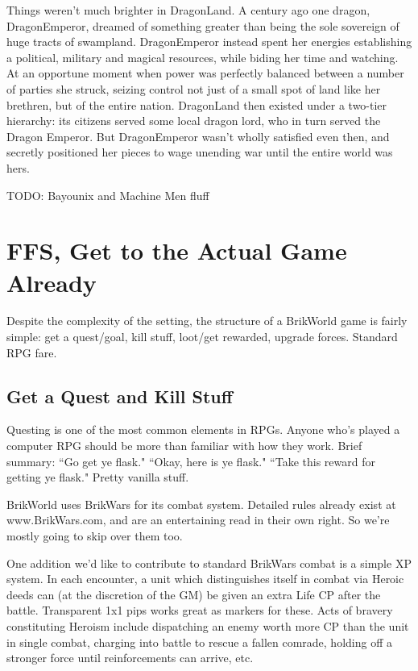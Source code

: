 \documentclass[12pt,a4paper,twocolumn]{article}
\begin{document}
Things weren't much brighter in DragonLand.  A century ago one dragon, DragonEmperor, dreamed of something greater than being the sole sovereign of huge tracts of swampland. DragonEmperor instead spent her energies establishing a political, military and magical resources, while biding her time and watching.  At an opportune moment when power was perfectly balanced between a number of parties she struck, seizing control not just of a small spot of land like her brethren, but of the entire nation.  DragonLand then existed under a two-tier hierarchy: its citizens served some local dragon lord, who in turn served the Dragon Emperor.  But DragonEmperor wasn't wholly satisfied even then, and secretly positioned her pieces to wage unending war until the entire world was hers.

TODO: Bayounix and Machine Men fluff

\section{FFS, Get to the Actual Game Already}

Despite the complexity of the setting, the structure of a BrikWorld game is fairly simple: get a quest/goal, kill stuff, loot/get rewarded, upgrade forces.  Standard RPG fare.

\subsection{Get a Quest and Kill Stuff}

Questing is one of the most common elements in RPGs. Anyone who's played a computer RPG should be more than familiar with how they work.  Brief summary: ``Go get ye flask." ``Okay, here is ye flask." ``Take this reward for getting ye flask."  Pretty vanilla stuff.  

BrikWorld uses BrikWars for its combat system.  Detailed rules already exist at www.BrikWars.com, and are an entertaining read in their own right.  So we're mostly going to skip over them too.  

One addition we'd like to contribute to standard BrikWars combat is a simple XP system.  In each encounter, a unit which distinguishes itself in combat via Heroic deeds can (at the discretion of the GM) be given an extra Life CP after the battle.  Transparent 1x1 pips works great as markers for these.  Acts of bravery constituting Heroism include dispatching an enemy worth more CP than the unit in single combat, charging into battle to rescue a fallen comrade, holding off a stronger force until reinforcements can arrive, etc.  
\end{document}
